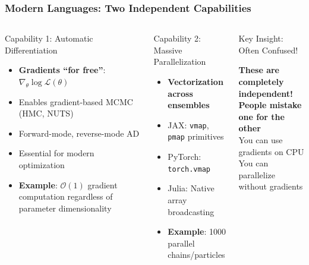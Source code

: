 \documentclass[aspectratio=169]{beamer}
\begin{document}
\begin{frame}
    \frametitle{Modern Languages: Two Independent Capabilities}
    \begin{columns}
        \begin{block}{Capability 1: Automatic Differentiation}
            \begin{itemize}
                \item \textbf{Gradients ``for free''}: $\nabla_\theta \log \mathcal{L}(\theta)$
                \item Enables gradient-based MCMC (HMC, NUTS)
                \item Forward-mode, reverse-mode AD
                \item Essential for modern optimization
                \item \textbf{Example}: $\mathcal{O}(1)$ gradient computation regardless of parameter dimensionality
            \end{itemize}
        \end{block}
        \begin{block}{Capability 2: Massive Parallelization}
            \begin{itemize}
                \item \textbf{Vectorization across ensembles}
                \item JAX: \texttt{vmap}, \texttt{pmap} primitives
                \item PyTorch: \texttt{torch.vmap}
                \item Julia: Native array broadcasting
                \item \textbf{Example}: 1000 parallel chains/particles
            \end{itemize}
        \end{block}
        \begin{block}{Key Insight: Often Confused!}
            \begin{center}
                \textbf{These are completely independent!}\\
                \vspace{5pt}
                \textbf{People mistake one for the other}\\
                \vspace{10pt}
                You can use gradients on CPU\\
                You can parallelize without gradients\\

\end{center}
\end{block}
\end{columns}
\end{frame}
\end{document}
